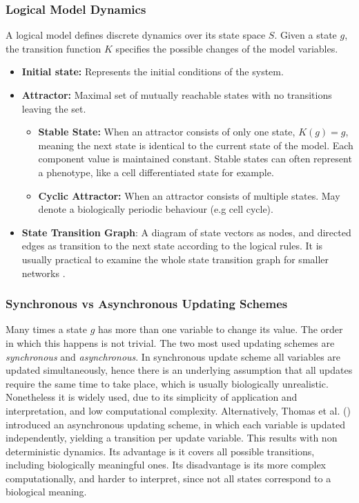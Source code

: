 \subsubsection{Logical Model Dynamics}
A logical model defines discrete dynamics over its state space $S$. Given a state $g$, the transition function $K$ 
specifies the possible changes of the model variables. 

\begin{itemize}
    \item \textbf{Initial state:} Represents the initial conditions of the system. 
    \item \textbf{Attractor:} Maximal set of mutually reachable states with no transitions leaving the set.  
    \begin{itemize}
        \item \textbf{Stable State:} When an attractor consists of only one state, $K(g)=g$, meaning the next state is 
            identical to the current state of the model. Each component value is maintained constant. 
            Stable states can often represent a phenotype, like a cell differentiated state for example.
        \item \textbf{Cyclic Attractor:} When an attractor consists of multiple states. May denote a biologically periodic 
            behaviour (e.g cell cycle).
    \end{itemize}
    \item \textbf{State Transition Graph}: A diagram of state vectors as nodes, and directed edges as transition to the 
        next state according to the logical rules.
It is usually practical to examine the whole state transition graph for smaller networks \cite{naldi2018logical}. 

\end{itemize}

\subsubsection{Synchronous vs Asynchronous Updating Schemes}
Many times a state $g$ has more than one variable to change its value.  
The order in which this happens is not trivial. The two most used updating schemes are \textit{synchronous} and 
\textit{asynchronous}. In synchronous update scheme all variables are updated simultaneously, hence there is an 
underlying assumption that all updates require the same time to take place, which is usually biologically unrealistic. 
Nonetheless it is widely used, due to its simplicity of application and interpretation, and low computational complexity. 
Alternatively, Thomas et al. (\cite{thomas1991regulatory}) introduced an asynchronous updating scheme, 
in which each variable is updated independently, yielding a transition per update variable. This results with non 
deterministic dynamics. Its advantage is it covers all possible transitions, including biologically meaningful ones. 
Its disadvantage is its more complex computationally, and harder to interpret, since not all states correspond to a 
biological meaning. 

